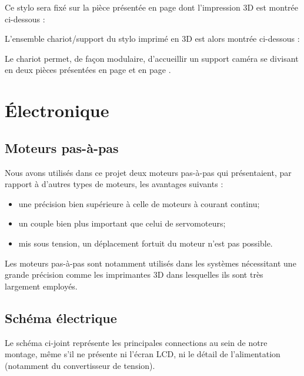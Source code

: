 \documentclass[12pt,a4paper]{report}
\begin{document}
	
	Ce stylo sera fixé sur la pièce présentée en page \pageref{supportstylo} dont l'impression 3D est montrée ci-dessous :
	
	
L'ensemble chariot/support du stylo imprimé en 3D est alors montrée ci-dessous :


Le chariot permet, de façon modulaire, d'accueillir un support caméra se divisant en deux pièces présentées en page \pageref{chariotcamera} et en page \pageref{supportcamera}.
	

	\chapter{Électronique}
\section{Moteurs pas-à-pas}
\label{Elec_stepper}
Nous avons utilisés dans ce projet deux moteurs pas-à-pas qui présentaient, par rapport à d'autres types de moteurs, les avantages suivants : 
\begin{itemize}[label=--]
\item une précision bien supérieure à celle de moteurs à courant continu;
\item un couple bien plus important que celui de servomoteurs;
\item mis sous tension, un déplacement fortuit du moteur n'est pas possible.
\end{itemize}
Les moteurs pas-à-pas sont notamment utilisés dans les systèmes nécessitant une grande précision comme les imprimantes 3D dans lesquelles ils sont très largement employés.

\section{Schéma électrique}
Le schéma ci-joint représente les principales connections au sein de notre montage, même s'il ne présente ni l'écran LCD, ni le détail de l'alimentation (notamment du convertisseur de tension).
\end{document}
